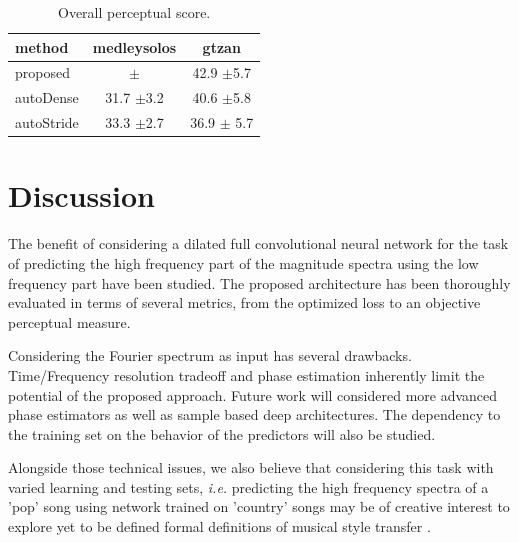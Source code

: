 \documentclass{article}
\begin{document}
\begin{table}[t]
\begin{center}
\begin{tabular}{lcc}
method & medleysolos & gtzan \\
\hline
proposed & $\pm$ & 42.9 $\pm$5.7 \\
autoDense & 31.7 $\pm$3.2 & 40.6 $\pm$5.8 \\
autoStride & 33.3 $\pm$2.7 & 36.9 $\pm$ 5.7 \\
\end{tabular}
\caption{Overall perceptual score.}
\end{center}
\label{tab:ops}
\vspace{-4mm}
\end{table}

\section{Discussion}
\label{sec:discussion}

The benefit of considering a dilated full convolutional neural network for the task of predicting the high frequency part of the magnitude spectra using the low frequency part have been studied. The proposed architecture has been thoroughly evaluated in terms of several metrics, from the optimized loss to an objective perceptual measure.

Considering the Fourier spectrum as input has several drawbacks. Time/Frequency resolution tradeoff and phase estimation inherently limit the potential of the proposed approach. Future work will considered more advanced phase estimators as well as sample based deep architectures. The dependency to the training set on the behavior of the predictors will also be studied.




Alongside those technical issues, we also believe that considering this task with varied learning and testing sets, \textit{i.e.} predicting the high frequency spectra of a 'pop' song using network trained on 'country' songs may be of creative interest to explore yet to be defined formal definitions of musical style transfer \cite{dai2018music}.


\vfill\pagebreak




\end{document}
